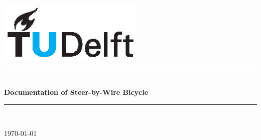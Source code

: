 \begin{titlepage}
    \begin{center}
        \includegraphics[width= 7cm]{Img/TU_Delft_logo_CMYK.eps}
        
        \rule{\linewidth}{0.5mm} \\[0.25cm]
            {\Large \bfseries Documentation of Steer-by-Wire Bicycle\\[0.25cm]} 
        \rule{\linewidth}{0.5mm} \\ [2cm]
        
        \vspace*{\fill} 
        
        \today
    \end{center}
\end{titlepage}